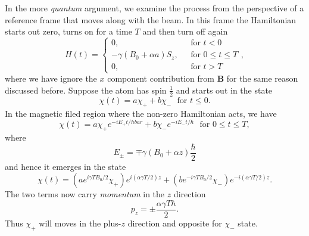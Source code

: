 In the more \textit{quantum} argument, we examine the process from the perspective of a reference frame that moves along with the beam.
In this frame the Hamiltonian starts out zero, turns on for a time $T$ and then turn off again
\begin{equation}
  \label{eq:4-120}
  H \left( t \right) =
  \begin{cases}
    0,~ ~ ~ &\text{for $t<0$} \\
    -\gamma \left( B_0 + \alpha a \right) S_z, ~ ~ ~ &\text{for $0\leq t \leq T$}\\
    0,~ ~ ~  &\text{for $t>T$}
  \end{cases},
\end{equation}
where we have ignore the $x$ component contribution from $\mathbf{B}$ for the same reason discussed before.
Suppose the atom has spin $\frac{1}{2}$ and starts out in the state
\begin{equation*}
\chi(t) = a \chi_+ + b \chi_- ~ ~ ~ \text{for $t\leq 0$}.
\end{equation*}
In the magnetic filed region where the non-zero Hamiltonian acts, we have
\begin{equation*}
\chi \left( t \right) = a \chi_+ e^{-i E_+ t/hbar} + b \chi_- e^{-iE_-t/\hbar} ~ ~ ~ \text{for $0\leq t \leq T$},
\end{equation*}
where
\begin{equation}
  \label{eq:4-121}
  E_{\pm} = \mp \gamma \left( B_0 +\alpha z \right) \frac{\hbar}{2}
\end{equation}
and hence it emerges in the state
\begin{equation}
  \label{eq:4-122}
  \chi \left( t \right) = \left( a e^{i\gamma T B_0/2} \chi_+ \right) e^{i \left( \alpha \gamma T/2 \right)z} + \left( b e^{-i\gamma T B_0/2} \chi_- \right) e^{-i \left( \alpha \gamma T/2 \right)z}.
\end{equation}
The two terms now carry \textit{momentum} in the $z$ direction
\begin{equation}
  \label{eq:4-123}
 p_z = \pm \frac{\alpha \gamma T \hbar}{2}.
\end{equation}
Thus $\chi_+$ will moves in the plus-$z$ direction and opposite for $\chi_-$ state.

